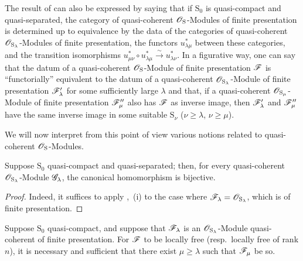 \begin{scholium}[8.5.3]
\label{IV.8.5.3}
The result of  can also be expressed by saying that if $\mathrm{S}_0$ is quasi-compact and quasi-separated, the category of quasi-coherent $\mathscr{O}_\mathrm{S}$-Modules of finite presentation is determined up to equivalence by the data of the categories of quasi-coherent $\mathscr{O}_{\mathrm{S}_\lambda}$-Modules of finite presentation, the functors $u_{\lambda\mu}^*$ between these categories, and the transition isomorphisms $u_{\mu\nu}^*\circ u_{\lambda\mu}^*\xrightarrow{\sim}u_{\lambda\nu}^*$.
In a figurative way, one can say that the datum of a quasi-coherent $\mathscr{O}_\mathrm{S}$-Module of finite presentation $\mathscr{F}$ is ``functorially'' equivalent to the datum of a quasi-coherent $\mathscr{O}_{\mathrm{S}_\lambda}$-Module of finite presentation $\mathscr{F}'_\lambda$ for some sufficiently large $\lambda$ and that, if a quasi-coherent $\mathscr{O}_{\mathrm{S}_\mu}$-Module of finite presentation $\mathscr{F}''_\mu$ also has $\mathscr{F}$ as inverse image, then $\mathscr{F}'_\lambda$ and $\mathscr{F}''_\mu$ have the same inverse image in some suitable $\mathrm{S}_\nu$ ($\nu\geqslant\lambda$, $\nu\geqslant\mu$).

We will now interpret from this point of view various notions related to quasi-coherent $\mathscr{O}_\mathrm{S}$-Modules.
\end{scholium}

\begin{corollary}[8.5.4]
\label{IV.8.5.4}
Suppose $\mathrm{S}_0$ quasi-compact and quasi-separated; then, for every quasi-coherent $\mathscr{O}_{\mathrm{S}_\lambda}$-Module $\mathscr{G}_\lambda$, the canonical homomorphism  is bijective.
\end{corollary}

\begin{proof}
Indeed, it suffices to apply ,~(i) to the case where $\mathscr{F}_\lambda=\mathscr{O}_{\mathrm{S}_\lambda}$, which is of finite presentation.
\end{proof}

\begin{proposition}[8.5.5]
\label{IV.8.5.5}
Suppose $\mathrm{S}_0$ quasi-compact, and suppose that $\mathscr{F}_\lambda$ is an $\mathscr{O}_{\mathrm{S}_\lambda}$-Module quasi-coherent of finite presentation.
For $\mathscr{F}$ to be locally free (\textup{resp.}\ locally free of rank $n$), it is necessary and sufficient that there exist $\mu\geqslant\lambda$ such that $\mathscr{F}_\mu$ be so.
\end{proposition}

